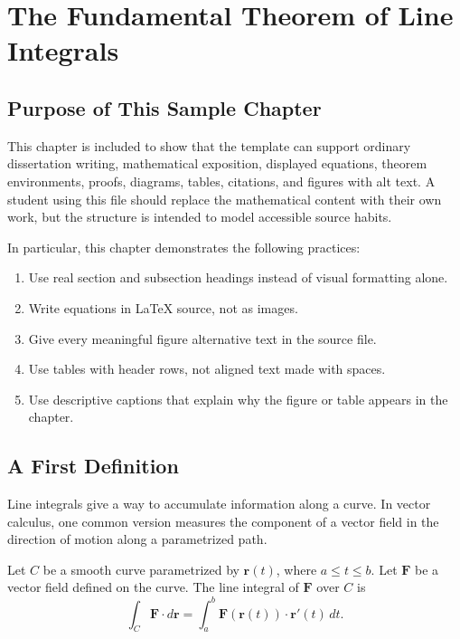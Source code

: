 \chapter{The Fundamental Theorem of Line Integrals}
\label{chap-one}

\section{Purpose of This Sample Chapter}
\label{sec:sample-purpose}

This chapter is included to show that the template can support ordinary dissertation writing, mathematical exposition, displayed equations, theorem environments, proofs, diagrams, tables, citations, and figures with alt text. A student using this file should replace the mathematical content with their own work, but the structure is intended to model accessible source habits.

In particular, this chapter demonstrates the following practices:
\begin{enumerate}
  \item Use real section and subsection headings instead of visual formatting alone.
  \item Write equations in LaTeX source, not as images.
  \item Give every meaningful figure alternative text in the source file.
  \item Use tables with header rows, not aligned text made with spaces.
  \item Use descriptive captions that explain why the figure or table appears in the chapter.
\end{enumerate}

\section{A First Definition}
\label{sec:line-integral-definitions}

Line integrals give a way to accumulate information along a curve. In vector calculus, one common version measures the component of a vector field in the direction of motion along a parametrized path.

\begin{definition}
\label{def:line-integral}
Let \(C\) be a smooth curve parametrized by \(\mathbf r(t)\), where \(a \leq t \leq b\). Let \(\mathbf F\) be a vector field defined on the curve. The line integral of \(\mathbf F\) over \(C\) is
\[
\int_C \mathbf F \cdot d\mathbf r
= \int_a^b \mathbf F(\mathbf r(t)) \cdot \mathbf r'(t)\,dt.
\]
\end{definition}

